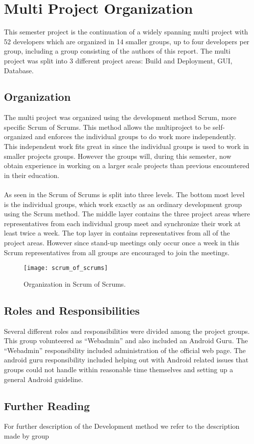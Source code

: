 
\section{Multi Project Organization}
\label{sec:multi_project_organization}

This semester project is the continuation of a widely spanning multi project with 52 developers which are organized in 14 smaller groups, up to four developers per group, including a group consisting of the authors of this report. The multi project was split into 3 different project areas: Build and Deployment, GUI, Database. 

\subsection{Organization}
The multi project was organized using the development method Scrum\parencite{scrum}, more specific Scrum of Scrums. This method allows the multiproject to be self-organized and enforces the individual groups to do work more independently. This independent work fits great in since the individual groups is used to work in smaller projects groups. However the groups will, during this semester, now obtain experience in working on a larger scale projects than previous encountered in their education. 
\\\\
As seen in  the Scrum of Scrums is split into three levels. The bottom most level is the individual groups, which work exactly as an ordinary development group using the Scrum method. The middle layer contains the three project areas where representatives from each individual group meet and synchronize their work at least twice a week. The top layer in  contains representatives from all of the project areas. However since stand-up meetings only occur once a week in this Scrum representatives from all groups are encouraged to join the meetings.

\begin{figure}[!htbp]
  \centering
    \texttt{[image: scrum\_of\_scrums]}
    \caption{Organization in Scrum of Scrums.}
    \label{fig:scrum_of_scrums}
\end{figure}

\subsection{Roles and Responsibilities}
Several different roles and responsibilities were divided among the project groups. This group volunteered as ``Webadmin'' and also included an Android Guru. The ``Webadmin'' responsibility included administration of the official \giraf web page. The android guru responsibility included helping out with Android related issues that groups could not handle within reasonable time themselves and setting up a general Android guideline. 

\subsection{Further Reading}
For further description of the \giraf Development method we refer to the description made by group 